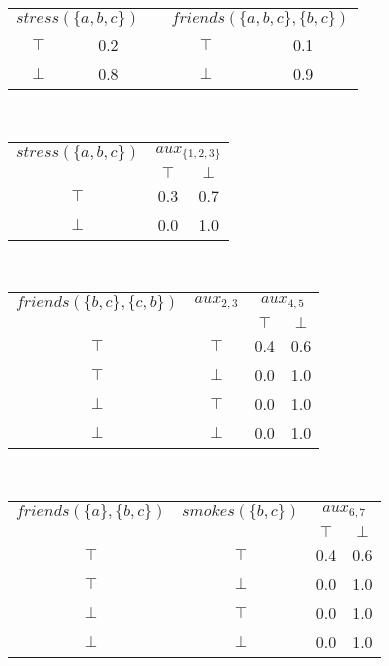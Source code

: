 \begin{multicols*}{2}
\begin{center}

	\begin{tabular}{ccccc}
		\multicolumn{2}{c}{\underline{$stress(\{a,b,c\})$}} & & \multicolumn{2}{c}{\underline{$friends(\{a,b,c\},\{b,c\})$}}\\
		$\top$ & 0.2 & & $\top$ & 0.1\\
		$\bot$ & 0.8 & & $\bot$ & 0.9 \\
	\end{tabular}
	\vspace{0.5cm}\\
	
	\begin{tabular}{c|cc}
		\underline{$stress(\{a,b,c\})$} & \multicolumn{2}{c}{\underline{$aux_{\{1,2,3\}}$}} \\
		& $\top$ & $\bot$ \\
		$\top$ & 0.3 & 0.7 \\
		$\bot$ & 0.0 & 1.0
	\end{tabular}
	\vspace{0.5cm}\\
	
	\begin{tabular}{cc|cc}
		\underline{$friends(\{b,c\},\{c,b\})$} & \underline{$aux_{2,3}$} & \multicolumn{2}{c}{\underline{$aux_{4,5}$}} \\
		& & $\top$ & $\bot$ \\
		$\top$ & $\top$ & 0.4 & 0.6 \\
		$\top$ & $\bot$ & 0.0 & 1.0 \\
		$\bot$ & $\top$ & 0.0 & 1.0 \\
		$\bot$ & $\bot$ & 0.0 & 1.0 \\
	\end{tabular}
	\vspace{0.5cm}\\
	
	\begin{tabular}{cc|cc}
		\underline{$friends(\{a\},\{b,c\})$} & \underline{$smokes(\{b,c\})$} & \multicolumn{2}{c}{\underline{$aux_{6,7}$}} \\
		& & $\top$ & $\bot$ \\
		$\top$ & $\top$ & 0.4 & 0.6 \\
		$\top$ & $\bot$ & 0.0 & 1.0 \\
		$\bot$ & $\top$ & 0.0 & 1.0 \\
		$\bot$ & $\bot$ & 0.0 & 1.0 \\
	\end{tabular}
	\vspace{0.5cm}\\
	

\end{center}
\end{multicols*}
